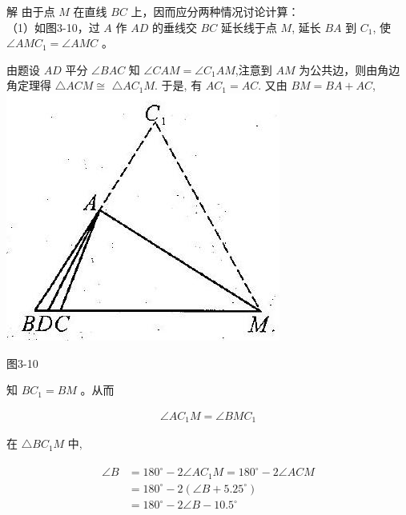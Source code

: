 \documentclass[10pt]{article}
\begin{document}
解 由于点 $M$ 在直线 $B C$ 上，因而应分两种情况讨论计算：\\
（1）如图3-10，过 $A$ 作 $A D$ 的垂线交 $B C$ 延长线于点 $M$, 延长 $B A$ 到 $C_{1}$, 使 $\angle A M C_{1}=\angle A M C$ 。

由题设 $A D$ 平分 $\angle B A C$ 知 $\angle C A M=\angle C_{1} A M$,注意到 $A M$ 为公共边，则由角边角定理得 $\triangle A C M \cong$ $\triangle A C_{1} M$. 于是, 有 $A C_{1}=A C$. 又由 $B M=B A+A C$,\\
\includegraphics[max width=\textwidth, center]{2024_10_30_2c8f45efd4a519b08e1ag-029(1)}

图3-10

知 $B C_{1}=B M$ 。从而

\begin{align*}
\angle A C_{1} M=\angle B M C_{1}
\end{align*}

在 $\triangle B C_{1} M$ 中,

\begin{align*}
\begin{aligned}
\angle B & =180^{\circ}-2 \angle A C_{1} M=180^{\circ}-2 \angle A C M \\
& =180^{\circ}-2\left(\angle B+5.25^{\circ}\right) \\
& =180^{\circ}-2 \angle B-10.5^{\circ}
\end{aligned}
\end{align*}
\end{document}
